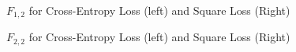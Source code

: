 \documentclass[fleqn]{report}
\begin{document}
\begin{figure}[H]
    \centering
    \qquad
    \caption{$F_{1,2}$ for Cross-Entropy Loss (left) and Square Loss (Right)}
    \label{fig:error_plot_2}
\end{figure}
\begin{figure}[H]
    \centering
    \qquad
    \caption{$F_{2,2}$ for Cross-Entropy Loss (left) and Square Loss (Right)}
    \label{fig:error_plot_3}
\end{figure}
\end{document}

